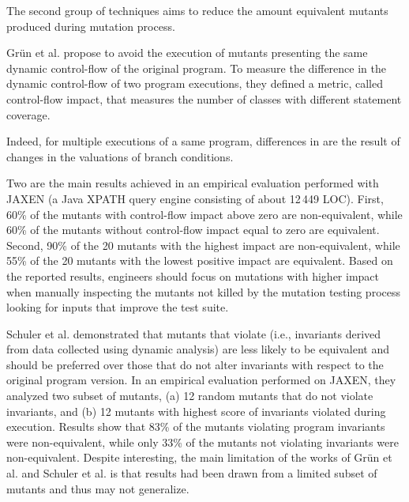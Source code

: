 The second group of techniques aims to reduce the amount equivalent mutants produced during mutation process.

Gr\"{u}n et al. \cite{grun2009impact} propose to avoid the execution of mutants presenting the same dynamic control-flow of the original program.
To measure the difference in the dynamic control-flow of two program executions, they defined a metric, called control-flow impact, that measures
the number of classes with different statement coverage.

Indeed, for multiple executions of a same program, differences in  are the result of changes in the valuations of branch conditions.

Two are the main results achieved in an empirical evaluation performed with JAXEN (a Java XPATH query engine consisting of about 12\,449 LOC). 
First, 60\% of the mutants with control-flow impact above zero are non-equivalent, while 60\% of the mutants without control-flow impact equal to zero are equivalent. 
Second, 90\% of the 20 mutants with the highest impact are non-equivalent, while 55\% of the 20 mutants with the lowest positive impact are equivalent. 
Based on the reported results, engineers should focus on mutations with higher impact when manually inspecting the mutants not killed by the mutation testing process looking for inputs that improve the test suite.

Schuler et al. \cite{schuler2009efficient} demonstrated that mutants that violate  (i.e., invariants derived from data collected using dynamic analysis) are less likely to be equivalent and should be preferred over those that do not alter invariants with respect to the original program version. In an empirical evaluation performed on JAXEN, they analyzed two subset of mutants, 
(a) 12 random mutants that do not violate invariants, and (b) 12 mutants with highest score of invariants violated during execution. 
Results show that 83\% of the mutants violating program invariants were non-equivalent, while only 33\% of 
the mutants not violating invariants were non-equivalent.
Despite interesting, the main limitation of the works of Gr\"{u}n et al. \cite{grun2009impact} and Schuler et al. \cite{schuler2009efficient} is that results had been drawn from a limited subset of mutants and thus may not generalize.

